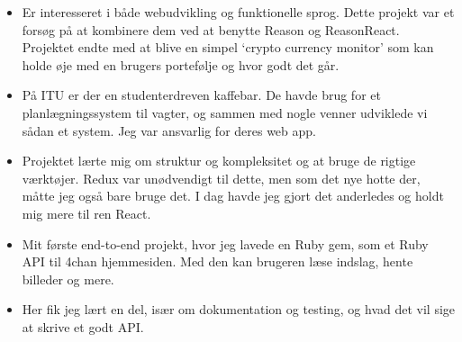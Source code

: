 






\begin{itemize}
  \item Er interesseret i både webudvikling og funktionelle sprog. Dette
    projekt var et forsøg på at kombinere dem ved at benytte Reason og
    ReasonReact. Projektet endte med at blive en simpel `crypto currency monitor' som
    kan holde øje med en brugers portefølje og hvor godt det går.
\end{itemize}
\smallskip
\smallskip
{}
\begin{itemize}
  \item På ITU er der en studenterdreven kaffebar. De havde brug for et
    planlægningssystem til vagter, og sammen med nogle venner udviklede vi
    sådan et system. Jeg var ansvarlig for deres web app.
  \item Projektet lærte mig om struktur og kompleksitet og at bruge de rigtige
    værktøjer. Redux var unødvendigt til dette, men som det nye hotte der,
    måtte jeg også bare bruge det. I dag havde jeg gjort det anderledes og
    holdt mig mere til ren React.
\end{itemize}
\smallskip
\smallskip
{}
\begin{itemize}
  \item Mit første end-to-end projekt, hvor jeg lavede en Ruby gem, som et Ruby
    API til 4chan hjemmesiden. Med den kan brugeren læse indslag, hente
    billeder og mere.
  \item Her fik jeg lært en del, især om dokumentation og testing, og hvad det
    vil sige at skrive et godt API.
\end{itemize}
